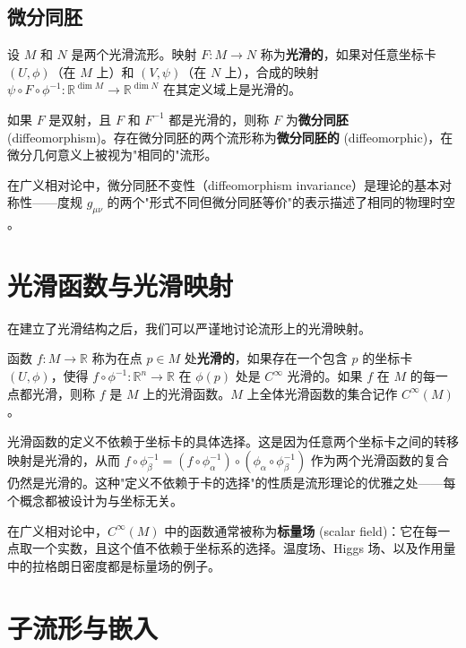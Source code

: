 \subsection{微分同胚}

\begin{definition}[微分同胚]
设 $M$ 和 $N$ 是两个光滑流形。映射 $F: M \to N$ 称为\textbf{光滑的}，如果对任意坐标卡 $(U, \phi)$（在 $M$ 上）和 $(V, \psi)$（在 $N$ 上），合成的映射 $\psi \circ F \circ \phi^{-1}: \mathbb{R}^{\dim M} \to \mathbb{R}^{\dim N}$ 在其定义域上是光滑的。

如果 $F$ 是双射，且 $F$ 和 $F^{-1}$ 都是光滑的，则称 $F$ 为\textbf{微分同胚} (diffeomorphism)。存在微分同胚的两个流形称为\textbf{微分同胚的} (diffeomorphic)，在微分几何意义上被视为"相同的"流形。
\end{definition}

在广义相对论中，微分同胚不变性（diffeomorphism invariance）是理论的基本对称性——度规 $g_{\mu\nu}$ 的两个"形式不同但微分同胚等价"的表示描述了相同的物理时空 \cite{Reall_Part3_GR}。

\section{光滑函数与光滑映射}

在建立了光滑结构之后，我们可以严谨地讨论流形上的光滑映射。

\begin{definition}[流形上的光滑函数]
函数 $f: M \to \mathbb{R}$ 称为在点 $p \in M$ 处\textbf{光滑的}，如果存在一个包含 $p$ 的坐标卡 $(U, \phi)$，使得 $f \circ \phi^{-1}: \mathbb{R}^n \to \mathbb{R}$ 在 $\phi(p)$ 处是 $C^\infty$ 光滑的。如果 $f$ 在 $M$ 的每一点都光滑，则称 $f$ 是 $M$ 上的光滑函数。$M$ 上全体光滑函数的集合记作 $C^\infty(M)$。
\end{definition}

\begin{remark}
光滑函数的定义不依赖于坐标卡的具体选择。这是因为任意两个坐标卡之间的转移映射是光滑的，从而 $f \circ \phi_\beta^{-1} = (f \circ \phi_\alpha^{-1}) \circ (\phi_\alpha \circ \phi_\beta^{-1})$ 作为两个光滑函数的复合仍然是光滑的。这种"定义不依赖于卡的选择"的性质是流形理论的优雅之处——每个概念都被设计为与坐标无关。
\end{remark}

在广义相对论中，$C^\infty(M)$ 中的函数通常被称为\textbf{标量场} (scalar field)：它在每一点取一个实数，且这个值不依赖于坐标系的选择。温度场、Higgs 场、以及作用量中的拉格朗日密度都是标量场的例子。

\section{子流形与嵌入}

